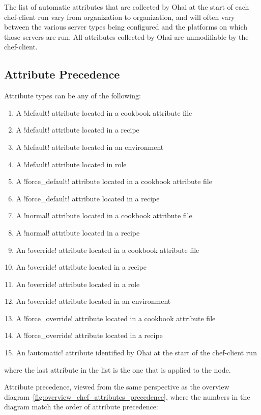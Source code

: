 The list of automatic attributes that are collected by Ohai at the start of each chef-client run vary from organization to organization, and will often vary between the various server types being configured and the platforms on which those servers are run. All attributes collected by Ohai are unmodifiable by the chef-client.

\subsection{Attribute Precedence}

Attribute types can be any of the following:

\begin{enumerate}
  \item A \inline!default! attribute located in a cookbook attribute file
  \item A \inline!default! attribute located in a recipe
  \item A \inline!default! attribute located in an environment
  \item A \inline!default! attribute located in role
  \item A \inline!force_default! attribute located in a cookbook attribute file
  \item A \inline!force_default! attribute located in a recipe
  \item A \inline!normal! attribute located in a cookbook attribute file
  \item A \inline!normal! attribute located in a recipe
  \item An \inline!override! attribute located in a cookbook attribute file
  \item An \inline!override! attribute located in a recipe
  \item An \inline!override! attribute located in a role
  \item An \inline!override! attribute located in an environment
  \item A \inline!force_override! attribute located in a cookbook attribute file
  \item A \inline!force_override! attribute located in a recipe
  \item An \inline!automatic! attribute identified by Ohai at the start of the chef-client run
\end{enumerate}

where the last attribute in the list is the one that is applied to the node.

Attribute precedence, viewed from the same perspective as the overview diagram~\ref{fig:overview_chef_attributes_precedence}, where the numbers in the diagram match the order of attribute precedence:

